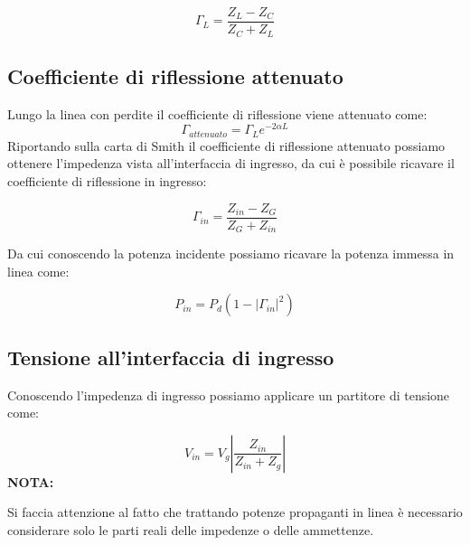 		\begin{equation}
		\Gamma_L=\frac{Z_L-Z_C}{Z_C+Z_L}
		\end{equation}



		\subsection{Coefficiente di riflessione attenuato}
		Lungo la linea con perdite il coefficiente di riflessione viene attenuato come:
		\begin{equation}
		\Gamma_{attenuato}=\Gamma_L e^{-2\alpha L}
		\end{equation}
		Riportando sulla carta di Smith il coefficiente di riflessione attenuato possiamo ottenere l'impedenza vista all'interfaccia di ingresso, da cui è possibile ricavare il coefficiente di riflessione in ingresso:

		\begin{equation}
		\Gamma_{in}=\frac{Z_{in}-Z_G}{Z_G+Z_{in}}
		\end{equation}

		Da cui conoscendo la potenza incidente possiamo ricavare la potenza immessa in linea come:

		\begin{equation}
		P_{in}=P_d(1-|\Gamma_{in}|^2)
		\end{equation}

		\subsection{Tensione all'interfaccia di ingresso}

		Conoscendo l'impedenza di ingresso possiamo applicare un partitore di tensione come:

		\begin{equation}
		V_{in}=V_g|\frac{Z_{in}}{Z_{in}+Z_g}|
		\end{equation}
		\textbf{NOTA:}

		Si faccia attenzione al fatto che trattando potenze propaganti in linea è necessario considerare solo le parti reali delle impedenze o delle ammettenze.